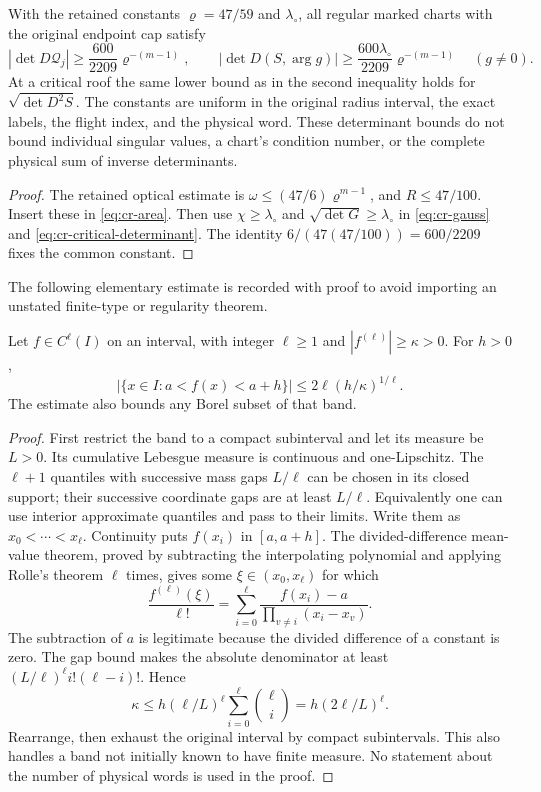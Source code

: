 \begin{corollary}
\label{cor:cr-determinant-growth}
With the retained constants $\varrho=47/59$ and $\lambda_\circ$,
all regular marked charts with the original endpoint cap satisfy
\[
 |\det D\mathcal Q_j|\ge\frac{600}{2209}\varrho^{-(m-1)},
 \qquad
 |\det D(S,\arg g)|\ge
       \frac{600\lambda_\circ}{2209}\varrho^{-(m-1)}
       \quad(g\ne0).
\]
At a critical roof the same lower bound as in the second inequality
holds for $\sqrt{\det D^2S}$. The constants are uniform in the
original radius interval, the exact labels, the flight index, and
the physical word. These determinant bounds do not bound individual
singular values, a chart's condition number, or the complete
physical sum of inverse determinants.
\end{corollary}
\begin{proof}
The retained optical estimate is
$\omega\le(47/6)\varrho^{m-1}$, and $R\le47/100$.
Insert these in \eqref{eq:cr-area}. Then use
$\chi\ge\lambda_\circ$ and
$\sqrt{\det G}\ge\lambda_\circ$ in
\eqref{eq:cr-gauss} and \eqref{eq:cr-critical-determinant}.
The identity $6/(47(47/100))=600/2209$ fixes the common constant.
\end{proof}

The following elementary estimate is recorded with proof to avoid
importing an unstated finite-type or regularity theorem.

\begin{lemma}
\label{lem:cr-band}
Let $f\in C^\ell(I)$ on an interval, with integer $\ell\ge1$ and
$|f^{(\ell)}|\ge\kappa>0$. For $h>0$,
\begin{equation}\label{eq:cr-band}
 |\{x\in I:a<f(x)<a+h\}|
          \le 2\ell(h/\kappa)^{1/\ell}.
\end{equation}
The estimate also bounds any Borel subset of that band.
\end{lemma}
\begin{proof}
First restrict the band to a compact subinterval and let its measure
be $L>0$. Its cumulative Lebesgue measure is continuous and
one-Lipschitz. The $\ell+1$ quantiles with successive mass gaps
$L/\ell$ can be chosen in its closed support; their successive
coordinate gaps are at least $L/\ell$. Equivalently one can use
interior approximate quantiles and pass to their limits. Write them
as $x_0<\cdots<x_\ell$. Continuity puts $f(x_i)$ in $[a,a+h]$.
The divided-difference mean-value theorem, proved by subtracting the
interpolating polynomial and applying Rolle's theorem $\ell$ times,
gives some $\xi\in(x_0,x_\ell)$ for which
\[
 \frac{f^{(\ell)}(\xi)}{\ell!}
  =\sum_{i=0}^{\ell}
       \frac{f(x_i)-a}{\prod_{v\ne i}(x_i-x_v)}.
\]
The subtraction of $a$ is legitimate because the divided difference
of a constant is zero. The gap bound makes the absolute denominator
at least $(L/\ell)^\ell i!(\ell-i)!$. Hence
\[
 \kappa\le h(\ell/L)^\ell
       \sum_{i=0}^{\ell}{\ell\choose i}
       =h(2\ell/L)^\ell.
\]
Rearrange, then exhaust the original interval by compact
subintervals. This also handles a band not initially known to have
finite measure. No statement about the number of physical words is
used in the proof.
\end{proof}

